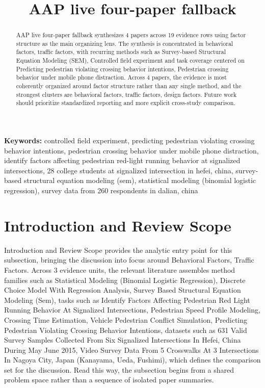 \documentclass{article}
\title{AAP live four-paper fallback}
\begin{document}
\maketitle
\begin{abstract}
AAP live four-paper fallback synthesizes 4 papers across 19 evidence rows using factor structure as the main organizing lens. The synthesis is concentrated in behavioral factors, traffic factors, with recurring methods such as Survey-based Structural Equation Modeling (SEM), Controlled field experiment and task coverage centered on Predicting pedestrian violating crossing behavior intentions, Pedestrian crossing behavior under mobile phone distraction. Across 4 papers, the evidence is most coherently organized around factor structure rather than any single method, and the strongest clusters are behavioral factors, traffic factors, design factors. Future work should prioritize standardized reporting and more explicit cross-study comparison.
\end{abstract}
\noindent\textbf{Keywords:} controlled field experiment, predicting pedestrian violating crossing behavior intentions, pedestrian crossing behavior under mobile phone distraction, identify factors affecting pedestrian red-light running behavior at signalized intersections, 28 college students at signalized intersection in hefei, china, survey-based structural equation modeling (sem), statistical modeling (binomial logistic regression), survey data from 260 respondents in dalian, china
\section{Introduction and Review Scope}
Introduction and Review Scope provides the analytic entry point for this subsection, bringing the discussion into focus around Behavioral Factors, Traffic Factors. Across 3 evidence units, the relevant literature assembles method families such as Statistical Modeling (Binomial Logistic Regression), Discrete Choice Model With Regression Analysis, Survey Based Structural Equation Modeling (Sem), tasks such as Identify Factors Affecting Pedestrian Red Light Running Behavior At Signalized Intersections, Pedestrian Speed Profile Modeling, Crossing Time Estimation, Vehicle Pedestrian Conflict Simulation, Predicting Pedestrian Violating Crossing Behavior Intentions, datasets such as 631 Valid Survey Samples Collected From Six Signalized Intersections In Hefei, China During May June 2015, Video Survey Data From 5 Crosswalks At 3 Intersections In Nagoya City, Japan (Kanayama, Ueda, Fushimi), which defines the comparison set for the discussion. Read this way, the subsection begins from a shared problem space rather than a sequence of isolated paper summaries. \cite{12_2016_zhang_aap,17_2017_chen_aap}
\end{document}

